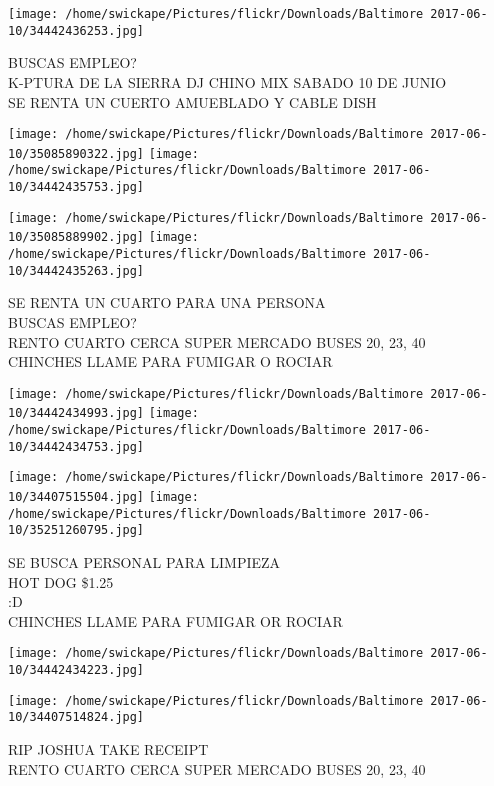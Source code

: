 \documentclass[10pt,letterpaper]{article}
\begin{document}
\vspace{0.25in}
\texttt{[image: /home/swickape/Pictures/flickr/Downloads/Baltimore 2017-06-10/34442436253.jpg]}

BUSCAS EMPLEO?\\
K{-}PTURA DE LA SIERRA DJ CHINO MIX SABADO 10 DE JUNIO\\
SE RENTA UN CUERTO AMUEBLADO Y CABLE DISH
\pagebreak

\texttt{[image: /home/swickape/Pictures/flickr/Downloads/Baltimore 2017-06-10/35085890322.jpg]}
\texttt{[image: /home/swickape/Pictures/flickr/Downloads/Baltimore 2017-06-10/34442435753.jpg]}

\texttt{[image: /home/swickape/Pictures/flickr/Downloads/Baltimore 2017-06-10/35085889902.jpg]}
\texttt{[image: /home/swickape/Pictures/flickr/Downloads/Baltimore 2017-06-10/34442435263.jpg]}

SE RENTA UN CUARTO PARA UNA PERSONA\\
BUSCAS EMPLEO?\\
RENTO CUARTO CERCA SUPER MERCADO BUSES 20, 23, 40\\
CHINCHES LLAME PARA FUMIGAR O ROCIAR
\pagebreak

\texttt{[image: /home/swickape/Pictures/flickr/Downloads/Baltimore 2017-06-10/34442434993.jpg]}
\texttt{[image: /home/swickape/Pictures/flickr/Downloads/Baltimore 2017-06-10/34442434753.jpg]}

\texttt{[image: /home/swickape/Pictures/flickr/Downloads/Baltimore 2017-06-10/34407515504.jpg]}
\texttt{[image: /home/swickape/Pictures/flickr/Downloads/Baltimore 2017-06-10/35251260795.jpg]}

SE BUSCA PERSONAL PARA LIMPIEZA\\
HOT DOG \$1.25\\
:D\\
CHINCHES LLAME PARA FUMIGAR OR ROCIAR
\pagebreak

\texttt{[image: /home/swickape/Pictures/flickr/Downloads/Baltimore 2017-06-10/34442434223.jpg]}

\vspace{0.25in}
\texttt{[image: /home/swickape/Pictures/flickr/Downloads/Baltimore 2017-06-10/34407514824.jpg]}

RIP JOSHUA TAKE RECEIPT\\
RENTO CUARTO CERCA SUPER MERCADO BUSES 20, 23, 40
\pagebreak
\end{document}
